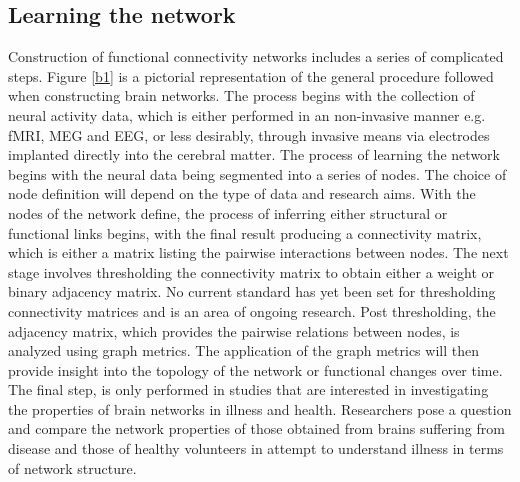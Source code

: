 \documentclass[11pt]{article}
\begin{document}
\subsection{Learning the network}
Construction of functional connectivity networks includes a series of complicated steps. Figure \ref{b1} is a pictorial representation of the general procedure followed when constructing brain networks. The process begins with the collection of neural activity data, which is either performed in an non-invasive manner e.g. fMRI, MEG and EEG, or less desirably, through invasive means via electrodes implanted directly into the cerebral matter. The process of learning the network begins with the neural data being segmented into a series of nodes. The choice of node definition will depend on the type of data and research aims. With the nodes of the network define, the process of inferring either structural or functional links begins, with the final result producing a connectivity matrix, which is either a matrix listing the pairwise interactions between nodes. The next stage involves thresholding the connectivity matrix to obtain either a weight or binary adjacency matrix. No current standard has yet been set for thresholding connectivity matrices and is an area of ongoing research. Post thresholding, the adjacency matrix, which provides the pairwise relations between nodes, is analyzed using graph metrics. The application of the graph metrics will then provide insight into the topology of the network or functional changes over time. The final step, is only performed in studies that are interested in investigating the properties of brain networks in illness and health. Researchers pose a question and compare the network properties of those obtained from brains suffering from disease and those of healthy volunteers in attempt to understand illness in terms of network structure.
\end{document}
